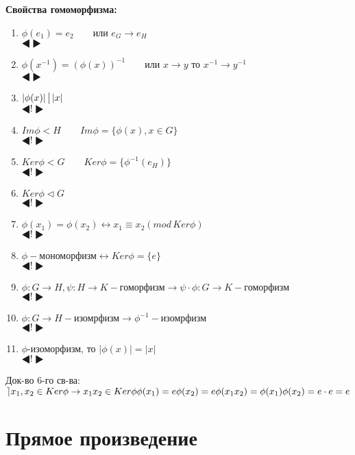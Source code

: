 \documentclass[12pt]{article}
\begin{document}
			\hypertarget{inpro:gom}{\textbf{Свойства гомоморфизма:}}
				\begin{enumerate}
					\item $\phi (e_1)=e_2 \qquad \text{или } e_G \rightarrow e_H$\\
						$\LHD  \RHD$
					\item $\phi (x^{-1})=(\phi (x))^{-1} \qquad \text{или } x\rightarrow y  \text{ то } x^{-1}\rightarrow y^{-1}$\\
						$\LHD  \RHD$
					\item $| \phi (x)|\, \big{|} \, |x|$\\
						$\LHD ! \RHD$
					\item $Im\phi < H \qquad Im\phi=\{ \phi (x), x\in G \}$\\
						$\LHD ! \RHD$
					\item $Ker\phi <G  \qquad  Ker \phi=\{ \phi^{-1}(e_H) \}$\\
						$\LHD ! \RHD$
					\item $Ker\phi \lhd G$\\
						$\LHD ! \RHD$
					\item $\phi (x_1)=\phi (x_2) \leftrightarrow x_1 \equiv x_2 (mod \, Ker\phi) $\\
						$\LHD ! \RHD$
					\item $\phi- \text{мономорфизм}\leftrightarrow Ker \phi =\{e\} $\\
						$\LHD ! \RHD$
					\item $\phi :G \rightarrow H, \psi :H\rightarrow K -\text{гоморфизм} \rightarrow \psi \cdot \phi : G \rightarrow K - \text{гоморфизм}$\\
						$\LHD ! \RHD$
					\item $\phi :G\rightarrow H-\text{изомрфизм} \rightarrow \phi^{-1}-\text{изомрфизм} $\\
						$\LHD ! \RHD$
					\item $\phi \text{-изоморфизм, то } |\phi (x)|=|x|$\\
						$\LHD ! \RHD$
				\end{enumerate}
				
			Док-во 6-го св-ва:$\rceil x_1, x_2 \in Ker\phi \rightarrow x_1 x_2 \in Ker\phi \\
			\phi (x_1)=e \\
			\phi (x_2)=e \\
			\phi (x_1x_2)=\phi (x_1) \phi (x_2)=e\cdot e=e$

		\newpage
		\section{Прямое произведение}
		
\end{document}

